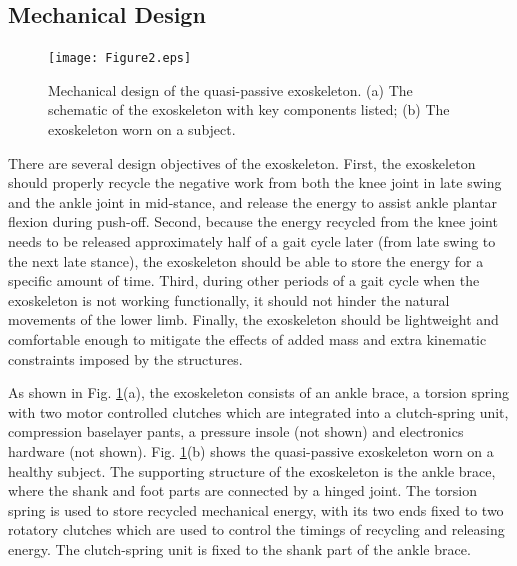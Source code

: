 \documentclass[10pt]{asme2ej}
\begin{document}
\subsection{Mechanical Design}

\begin{figure}[b]
	\centering
	\texttt{[image: Figure2.eps]}
	\caption{Mechanical design of the quasi-passive exoskeleton.
	(a) The schematic of the exoskeleton with key components listed; (b) The exoskeleton worn on a subject.}
	\label{fig:model}   
\end{figure}

There are several design objectives of the exoskeleton.
First, the exoskeleton should properly recycle the negative work from both the knee joint in late swing and the ankle joint in mid-stance, and release the energy to assist ankle plantar flexion during push-off.
Second, because the energy recycled from the knee joint needs to be released approximately half of a gait cycle later (from late swing to the next late stance), the exoskeleton should be able to store the energy for a specific amount of time.
Third, during other periods of a gait cycle when the exoskeleton is not working functionally, it should not hinder the natural movements of the lower limb.
Finally, the exoskeleton should be lightweight and comfortable enough to mitigate the effects of added mass and extra kinematic constraints imposed by the structures.

As shown in Fig. \ref{fig:model}(a), the exoskeleton consists of an ankle brace, a torsion spring with two motor controlled clutches which are integrated into a clutch-spring unit, compression baselayer pants, a pressure insole (not shown) and electronics hardware (not shown).
Fig. \ref{fig:model}(b) shows the quasi-passive exoskeleton worn on a healthy subject.
The supporting structure of the exoskeleton is the ankle brace, where the shank and foot parts are connected by a hinged joint.
The torsion spring is used to store recycled mechanical energy, with its two ends fixed to two rotatory clutches which are used to control the timings of recycling and releasing energy.
The clutch-spring unit is fixed to the shank part of the ankle brace.

\end{document}
